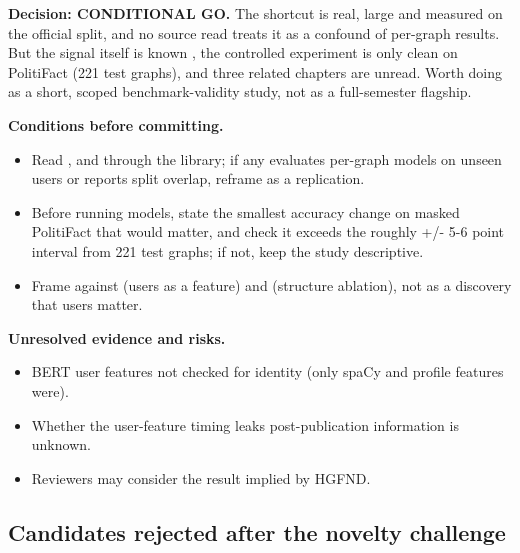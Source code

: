 \documentclass[11pt,a4paper]{article}
\begin{document}
\textbf{Decision: CONDITIONAL GO.} The shortcut is real, large and measured on the official split, and no source read treats it as a confound of per-graph results. But the signal itself is known \cite{jeong2022hgfnd}, the controlled experiment is only clean on PolitiFact (221 test graphs), and three related chapters are unread. Worth doing as a short, scoped benchmark-validity study, not as a full-semester flagship.

\textbf{Conditions before committing.}
\begin{itemize}
\item Read \cite{rai2025hypergraph}, \cite{rai2025attention} and \cite{bryla2026networks} through the library; if any evaluates per-graph models on unseen users or reports split overlap, reframe as a replication.
\item Before running models, state the smallest accuracy change on masked PolitiFact that would matter, and check it exceeds the roughly +/- 5-6 point interval from 221 test graphs; if not, keep the study descriptive.
\item Frame against \cite{jeong2022hgfnd} (users as a feature) and \cite{karn2025structure} (structure ablation), not as a discovery that users matter.
\end{itemize}

\textbf{Unresolved evidence and risks.}
\begin{itemize}
\item BERT user features not checked for identity (only spaCy and profile features were).
\item Whether the user-feature timing leaks post-publication information is unknown.
\item Reviewers may consider the result implied by HGFND.
\end{itemize}

\subsection{Candidates rejected after the novelty challenge}
\end{document}
